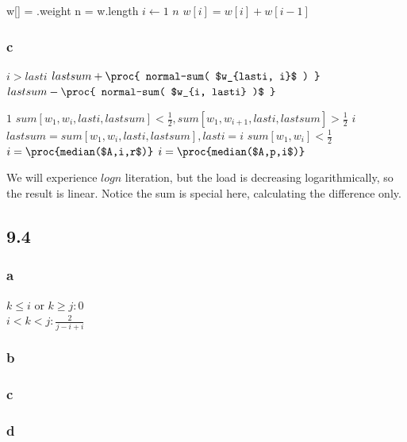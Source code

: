 \documentclass[]{article}
\begin{document}
\begin{codebox}
	\li w[] = .weight
	\li n = w.length
	\li	\For $i \gets 1$ \To $n$
	\li 	\Do $w[i] = w[i] + w[i-1]$
	\End
	\li \Return {}
\end{codebox}

\subsubsection{c}

\begin{codebox}
	\li \If $i>lasti$
	\li  \Then \Return $lastsum + \proc{ normal-sum( $w_{lasti, i}$ ) }$
	\li  \Else \Return $lastsum - \proc{ normal-sum( $w_{i, lasti} )$ }$ 
	\End
\end{codebox}

\begin{codebox}
	\li \While $1$
	\li		\Do \If $sum[w_{1}, w_{i}, lasti, lastsum] < \frac{1}{2}, sum[w_{1}, w_{i+1}, lasti, lastsum] > \frac{1}{2}$
	\li 		\Then \Return $i$
 	\li  	\Else
 	\li 	$lastsum = sum[w_{1}, w_{i}, lasti, lastsum], lasti = i$
 	\li 	\If  $sum[w_{1}, w_{i}] < \frac{1}{2}$
 	\li  		\Then $i = \proc{median($A,i,r$)}$
 	\li 	\Else $i = \proc{median($A,p,i$)}$
 	\End
\end{codebox}

We will experience $logn$ literation, but the load is decreasing logarithmically, so the result is linear. Notice the sum is special here, calculating the difference only.

\subsection{9.4}
\subsubsection{a}
$k \le i $ or $ k \ge j: 0$\\
$i < k < j: \frac{2}{j-i+i}$
\subsubsection{b}
\subsubsection{c}
\subsubsection{d}
\end{document}
